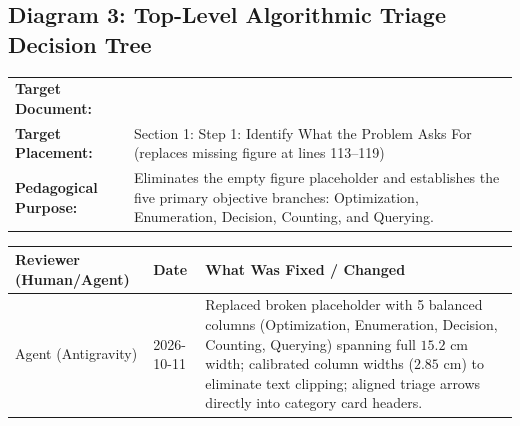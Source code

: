 \documentclass[11pt,a4paper]{article}
\newcommand{\breadcrumb}[3]{
    \par\vspace{0.15cm}
    \noindent\begin{tabularx}{\textwidth}{|l|X|}
    \hline
    \textbf{Target Document:} & \texttt{\detokenize{#1}} \\
    \textbf{Target Placement:} & #2 \\
    \textbf{Pedagogical Purpose:} & #3 \\
    \hline
    \end{tabularx}
    \vspace{0.15cm}\par
}
\newcommand{\diagramaudit}[3]{
    \par\vspace{0.12cm}
    \noindent\begin{tabularx}{\textwidth}{|l|l|>{\raggedright\arraybackslash}X|}
    \hline
    \textbf{Reviewer (Human/Agent)} & \textbf{Date} & \textbf{What Was Fixed / Changed} \\ \hline
    #1 & #2 & #3 \\ \hline
    \end{tabularx}
    \vspace{0.12cm}\par
}
\begin{document}
\subsection{Diagram 3: Top-Level Algorithmic Triage Decision Tree}

\breadcrumb{00.problem_solving_guide.tex}{Section 1: Step 1: Identify What the Problem Asks For (replaces missing figure at lines 113--119)}{Eliminates the empty figure placeholder and establishes the five primary objective branches: Optimization, Enumeration, Decision, Counting, and Querying.}

\diagramaudit{Agent (Antigravity)}{2026-10-11}{Replaced broken placeholder with 5 balanced columns (Optimization, Enumeration, Decision, Counting, Querying) spanning full $15.2\text{ cm}$ width; calibrated column widths ($2.85\text{ cm}$) to eliminate text clipping; aligned triage arrows directly into category card headers.}
\end{document}
